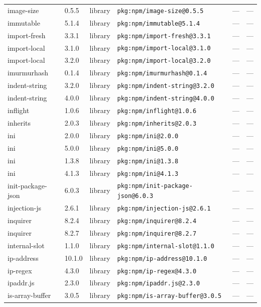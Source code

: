 \documentclass[11pt]{article}
\begin{document}
\begin{longtable}{|l|l|l|p{2.2cm}|l|p{4cm}|}
image-size & 0.5.5 & library & \texttt{pkg:npm/image-size@0.5.5} & — & — \\
immutable & 5.1.4 & library & \texttt{pkg:npm/immutable@5.1.4} & — & — \\
import-fresh & 3.3.1 & library & \texttt{pkg:npm/import-fresh@3.3.1} & — & — \\
import-local & 3.1.0 & library & \texttt{pkg:npm/import-local@3.1.0} & — & — \\
import-local & 3.2.0 & library & \texttt{pkg:npm/import-local@3.2.0} & — & — \\
imurmurhash & 0.1.4 & library & \texttt{pkg:npm/imurmurhash@0.1.4} & — & — \\
indent-string & 3.2.0 & library & \texttt{pkg:npm/indent-string@3.2.0} & — & — \\
indent-string & 4.0.0 & library & \texttt{pkg:npm/indent-string@4.0.0} & — & — \\
inflight & 1.0.6 & library & \texttt{pkg:npm/inflight@1.0.6} & — & — \\
inherits & 2.0.3 & library & \texttt{pkg:npm/inherits@2.0.3} & — & — \\
ini & 2.0.0 & library & \texttt{pkg:npm/ini@2.0.0} & — & — \\
ini & 5.0.0 & library & \texttt{pkg:npm/ini@5.0.0} & — & — \\
ini & 1.3.8 & library & \texttt{pkg:npm/ini@1.3.8} & — & — \\
ini & 4.1.3 & library & \texttt{pkg:npm/ini@4.1.3} & — & — \\
init-package-json & 6.0.3 & library & \texttt{pkg:npm/init-package-json@6.0.3} & — & — \\
injection-js & 2.6.1 & library & \texttt{pkg:npm/injection-js@2.6.1} & — & — \\
inquirer & 8.2.4 & library & \texttt{pkg:npm/inquirer@8.2.4} & — & — \\
inquirer & 8.2.7 & library & \texttt{pkg:npm/inquirer@8.2.7} & — & — \\
internal-slot & 1.1.0 & library & \texttt{pkg:npm/internal-slot@1.1.0} & — & — \\
ip-address & 10.1.0 & library & \texttt{pkg:npm/ip-address@10.1.0} & — & — \\
ip-regex & 4.3.0 & library & \texttt{pkg:npm/ip-regex@4.3.0} & — & — \\
ipaddr.js & 2.3.0 & library & \texttt{pkg:npm/ipaddr.js@2.3.0} & — & — \\
is-array-buffer & 3.0.5 & library & \texttt{pkg:npm/is-array-buffer@3.0.5} & — & — \\

\end{longtable}
\end{document}
